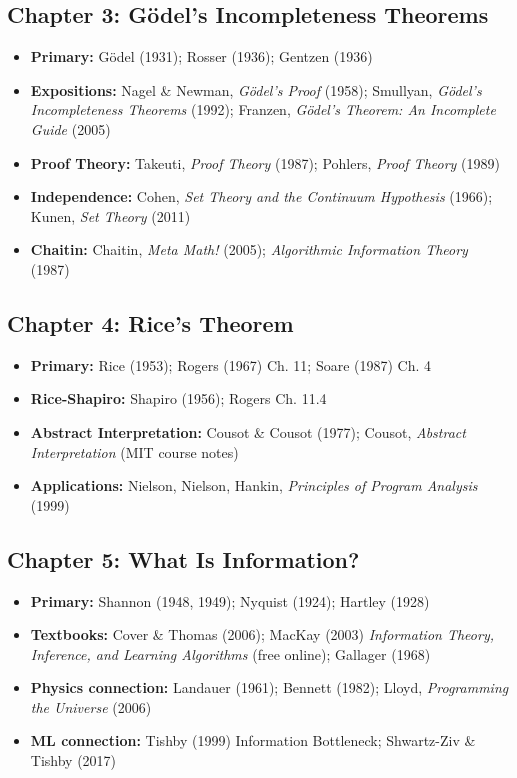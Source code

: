 \subsection{Chapter 3: G\"odel's Incompleteness Theorems}
\begin{itemize}
\item \textbf{Primary:} G\"odel (1931); Rosser (1936); Gentzen (1936)
\item \textbf{Expositions:} Nagel \& Newman, \emph{G\"odel's Proof} (1958); Smullyan, \emph{G\"odel's Incompleteness Theorems} (1992); Franzen, \emph{G\"odel's Theorem: An Incomplete Guide} (2005)
\item \textbf{Proof Theory:} Takeuti, \emph{Proof Theory} (1987); Pohlers, \emph{Proof Theory} (1989)
\item \textbf{Independence:} Cohen, \emph{Set Theory and the Continuum Hypothesis} (1966); Kunen, \emph{Set Theory} (2011)
\item \textbf{Chaitin:} Chaitin, \emph{Meta Math!} (2005); \emph{Algorithmic Information Theory} (1987)
\end{itemize}

\subsection{Chapter 4: Rice's Theorem}
\begin{itemize}
\item \textbf{Primary:} Rice (1953); Rogers (1967) Ch. 11; Soare (1987) Ch. 4
\item \textbf{Rice-Shapiro:} Shapiro (1956); Rogers Ch. 11.4
\item \textbf{Abstract Interpretation:} Cousot \& Cousot (1977); Cousot, \emph{Abstract Interpretation} (MIT course notes)
\item \textbf{Applications:} Nielson, Nielson, Hankin, \emph{Principles of Program Analysis} (1999)
\end{itemize}

\subsection{Chapter 5: What Is Information?}
\begin{itemize}
\item \textbf{Primary:} Shannon (1948, 1949); Nyquist (1924); Hartley (1928)
\item \textbf{Textbooks:} Cover \& Thomas (2006); MacKay (2003) \emph{Information Theory, Inference, and Learning Algorithms} (free online); Gallager (1968)
\item \textbf{Physics connection:} Landauer (1961); Bennett (1982); Lloyd, \emph{Programming the Universe} (2006)
\item \textbf{ML connection:} Tishby (1999) Information Bottleneck; Shwartz-Ziv \& Tishby (2017)
\end{itemize}

